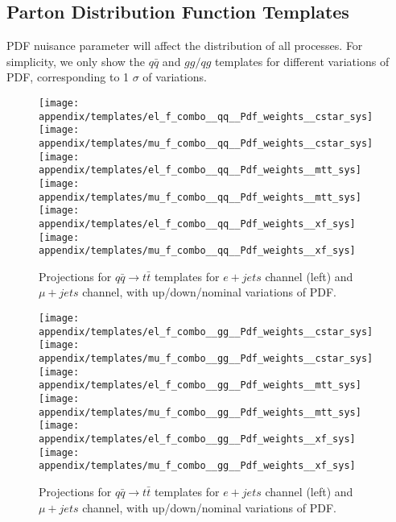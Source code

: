\subsection{Parton Distribution Function Templates}
PDF  nuisance parameter will affect the distribution of all processes. For simplicity, we only show the $q\bar q$ and $gg/qg$ templates for different variations of PDF, corresponding to 1 $\sigma$ of variations.
 	
\begin{figure}[hbt]
  \begin{center}
    \texttt{[image: appendix/templates/el\_f\_combo\_\_qq\_\_Pdf\_weights\_\_cstar\_sys]}
    \texttt{[image: appendix/templates/mu\_f\_combo\_\_qq\_\_Pdf\_weights\_\_cstar\_sys]}    
    \texttt{[image: appendix/templates/el\_f\_combo\_\_qq\_\_Pdf\_weights\_\_mtt\_sys]}
    \texttt{[image: appendix/templates/mu\_f\_combo\_\_qq\_\_Pdf\_weights\_\_mtt\_sys]}
    \texttt{[image: appendix/templates/el\_f\_combo\_\_qq\_\_Pdf\_weights\_\_xf\_sys]}
    \texttt{[image: appendix/templates/mu\_f\_combo\_\_qq\_\_Pdf\_weights\_\_xf\_sys]}
  \caption{\small Projections for $q\bar q \rightarrow t\bar t$ templates for $e+jets$ channel (left) and $\mu+jets$ channel, with up/down/nominal variations of PDF.}
  \label{appendix:PDF temp qq}
  \end{center}
\end{figure}

\begin{figure}[hbt]
  \begin{center}
    \texttt{[image: appendix/templates/el\_f\_combo\_\_gg\_\_Pdf\_weights\_\_cstar\_sys]}
    \texttt{[image: appendix/templates/mu\_f\_combo\_\_gg\_\_Pdf\_weights\_\_cstar\_sys]}    
    \texttt{[image: appendix/templates/el\_f\_combo\_\_gg\_\_Pdf\_weights\_\_mtt\_sys]}
    \texttt{[image: appendix/templates/mu\_f\_combo\_\_gg\_\_Pdf\_weights\_\_mtt\_sys]}
    \texttt{[image: appendix/templates/el\_f\_combo\_\_gg\_\_Pdf\_weights\_\_xf\_sys]}
    \texttt{[image: appendix/templates/mu\_f\_combo\_\_gg\_\_Pdf\_weights\_\_xf\_sys]}
  \caption{\small Projections for $q\bar q \rightarrow t\bar t$ templates for $e+jets$ channel (left) and $\mu+jets$ channel, with up/down/nominal variations of PDF.}
  \label{appendix:PDF temp gg}
  \end{center}
\end{figure}